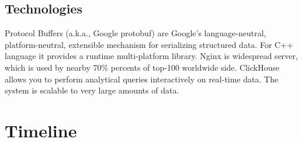 \documentclass[]{article}
\begin{document}
\subsection{Technologies}
Protocol Buffers (a.k.a., Google protobuf) are Google's language-neutral, platform-neutral, extensible mechanism for serializing structured data. 
For C++ language it provides a runtime multi-platform library. Nginx is widespread server, which is used by nearby 70\% percents of top-100 worldwide side. ClickHouse allows you to perform analytical queries interactively on real-time data. The system is scalable to very large amounts of data. 



\section{Timeline}
\end{document}
